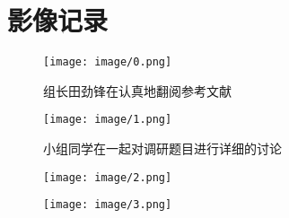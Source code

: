 \section{影像记录}

\begin{figure}[htp]
\centering
\texttt{[image: image/0.png]}
\caption{组长田劲锋在认真地翻阅参考文献}
\end{figure}

\begin{figure}[htp]
\centering
\texttt{[image: image/1.png]}
\caption{小组同学在一起对调研题目进行详细的讨论}
\end{figure}

\begin{figure}[htp]
\centering
\texttt{[image: image/2.png]}
\caption{}
\end{figure}

\begin{figure}[htp]
\centering
\texttt{[image: image/3.png]}
\caption{}
\end{figure}

\clearpage
